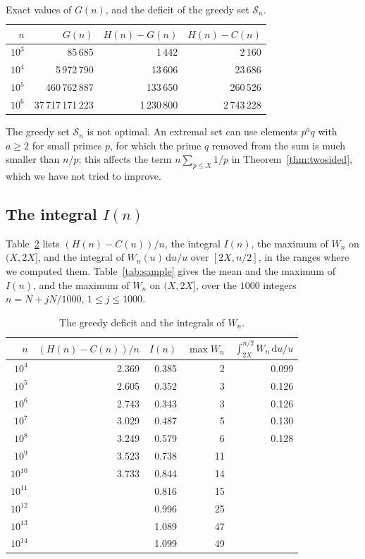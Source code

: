 \documentclass[11pt,reqno]{amsart}
\theoremstyle{definition}
\theoremstyle{remark}
\numberwithin{equation}{section}
\newcommand{\dd}{\mathrm{d}}
\newcommand{\cS}{\mathcal{S}}
\begin{document}
\begin{table}[ht]
\centering
\begin{tabular}{rrrr}
\toprule
$n$ & $G(n)$ & $H(n)-G(n)$ & $H(n)-C(n)$\\
\midrule
$10^3$ & 85\,685 & 1\,442 & 2\,160\\
$10^4$ & 5\,972\,790 & 13\,606 & 23\,686\\
$10^5$ & 460\,762\,887 & 133\,650 & 260\,526\\
$10^6$ & 37\,717\,171\,223 & 1\,230\,800 & 2\,743\,228\\
\bottomrule
\end{tabular}
\medskip
\caption{Exact values of $G(n)$, and the deficit of the greedy set $\cS_n$.}\label{tab:exact}
\end{table}

The greedy set $\cS_n$ is not optimal. An extremal set can use elements $p^aq$ with $a\ge2$ for small primes $p$, for which the prime $q$ removed from the sum is much smaller than $n/p$; this affects the term $n\sum_{p\le X}1/p$ in Theorem~\ref{thm:twosided}, which we have not tried to improve.

\subsection{\texorpdfstring{The integral $I(n)$}{The integral I(n)}}
Table~\ref{tab:sweep} lists $(H(n)-C(n))/n$, the integral $I(n)$, the maximum of $W_n$ on $(X,2X]$, and the integral of $W_n(u)\,\dd u/u$ over $[2X,n/2]$, in the ranges where we computed them. Table~\ref{tab:sample} gives the mean and the maximum of $I(n)$, and the maximum of $W_n$ on $(X,2X]$, over the $1000$ integers $n=N+jN/1000$, $1\le j\le1000$.

\begin{table}[ht]
\centering
\begin{tabular}{rrrrr}
\toprule
$n$ & $(H(n)-C(n))/n$ & $I(n)$ & $\max W_n$ & $\int_{2X}^{n/2}W_n\,\dd u/u$\\
\midrule
$10^{4}$ & 2.369 & 0.385 & 2 & 0.099\\
$10^{5}$ & 2.605 & 0.352 & 3 & 0.126\\
$10^{6}$ & 2.743 & 0.343 & 3 & 0.126\\
$10^{7}$ & 3.029 & 0.487 & 5 & 0.130\\
$10^{8}$ & 3.249 & 0.579 & 6 & 0.128\\
$10^{9}$ & 3.523 & 0.738 & 11 & \\
$10^{10}$ & 3.733 & 0.844 & 14 & \\
$10^{11}$ & & 0.816 & 15 & \\
$10^{12}$ & & 0.996 & 25 & \\
$10^{13}$ & & 1.089 & 47 & \\
$10^{14}$ & & 1.099 & 49 & \\
\bottomrule
\end{tabular}
\medskip
\caption{The greedy deficit and the integrals of $W_n$.}\label{tab:sweep}
\end{table}
\end{document}
